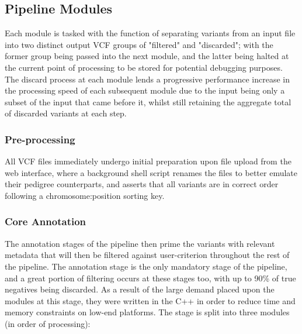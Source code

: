 
\subsection{Pipeline Modules}

Each module is tasked with the function of separating variants from an input file into two distinct output VCF groups of "filtered" and "discarded"; with the former group being passed into the next module, and the latter being halted at the current point of processing to be stored for potential debugging purposes. The discard process at each module lends a progressive performance increase in the processing speed of each subsequent module due to the input being only a subset of the input that came before it, whilst still retaining the aggregate total of discarded variants at each step.

\subsubsection{Pre-processing}

All VCF files immediately undergo initial preparation upon file upload from the web interface, where a background shell script renames the files to better emulate their pedigree counterparts, and asserts that all variants are in correct order following a chromosome:position sorting key.


\subsubsection{Core Annotation}

The annotation stages of the pipeline then prime the variants with relevant metadata that will then be filtered against user-criterion throughout the rest of the pipeline. The annotation stage is the only mandatory stage of the pipeline, and a great portion of filtering occurs at these stages too, with up to 90\% of true negatives being discarded. As a result of the large demand placed upon the modules at this stage, they were written in the C++ in order to reduce time and memory constraints on low-end platforms. The stage is split into three modules (in order of processing): 

